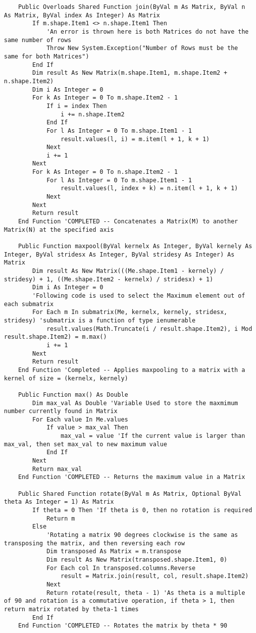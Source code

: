 \begin{verbatim}
    Public Overloads Shared Function join(ByVal m As Matrix, ByVal n As Matrix, ByVal index As Integer) As Matrix
        If m.shape.Item1 <> n.shape.Item1 Then
            'An error is thrown here is both Matrices do not have the same number of rows
            Throw New System.Exception("Number of Rows must be the same for both Matrices")
        End If
        Dim result As New Matrix(m.shape.Item1, m.shape.Item2 + n.shape.Item2)
        Dim i As Integer = 0
        For k As Integer = 0 To m.shape.Item2 - 1
            If i = index Then
                i += n.shape.Item2
            End If
            For l As Integer = 0 To m.shape.Item1 - 1
                result.values(l, i) = m.item(l + 1, k + 1)
            Next
            i += 1
        Next
        For k As Integer = 0 To n.shape.Item2 - 1
            For l As Integer = 0 To m.shape.Item1 - 1
                result.values(l, index + k) = n.item(l + 1, k + 1)
            Next
        Next
        Return result
    End Function 'COMPLETED -- Concatenates a Matrix(M) to another Matrix(N) at the specified axis

    Public Function maxpool(ByVal kernelx As Integer, ByVal kernely As Integer, ByVal stridesx As Integer, ByVal stridesy As Integer) As Matrix
        Dim result As New Matrix(((Me.shape.Item1 - kernely) / stridesy) + 1, ((Me.shape.Item2 - kernelx) / stridesx) + 1)
        Dim i As Integer = 0
        'Following code is used to select the Maximum element out of each submatrix
        For Each m In submatrix(Me, kernelx, kernely, stridesx, stridesy) 'submatrix is a function of type ienumerable
            result.values(Math.Truncate(i / result.shape.Item2), i Mod result.shape.Item2) = m.max()
            i += 1
        Next
        Return result
    End Function 'Completed -- Applies maxpooling to a matrix with a kernel of size = (kernelx, kernely)

    Public Function max() As Double
        Dim max_val As Double 'Variable Used to store the maxmimum number currently found in Matrix
        For Each value In Me.values
            If value > max_val Then
                max_val = value 'If the current value is larger than max_val, then set max_val to new maximum value
            End If
        Next
        Return max_val
    End Function 'COMPLETED -- Returns the maximum value in a Matrix

    Public Shared Function rotate(ByVal m As Matrix, Optional ByVal theta As Integer = 1) As Matrix
        If theta = 0 Then 'If theta is 0, then no rotation is required
            Return m
        Else
            'Rotating a matrix 90 degrees clockwise is the same as transposing the matrix, and then reversing each row
            Dim transposed As Matrix = m.transpose
            Dim result As New Matrix(transposed.shape.Item1, 0)
            For Each col In transposed.columns.Reverse
                result = Matrix.join(result, col, result.shape.Item2)
            Next
            Return rotate(result, theta - 1) 'As theta is a multiple of 90 and rotation is a commutative operation, if theta > 1, then return matrix rotated by theta-1 times
        End If
    End Function 'COMPLETED -- Rotates the matrix by theta * 90


\end{verbatim}
